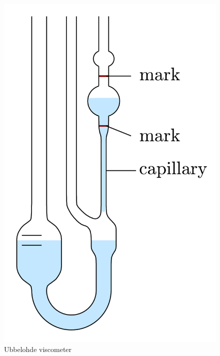 \begin{figure}
    \begin{minipage}{.3\textwidth}
    \centering
    \vspace{-.2mm}
    \includegraphics[scale=.25]{Bilder/fancy.pdf}
    \vspace{-.2mm}
    \caption{Ubbelohde viscometer}
    \label{fig:ubb}
    \end{minipage}
\end{figure}